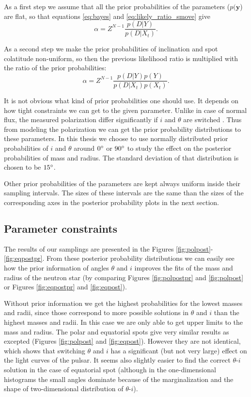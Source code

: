 \documentclass{wihuri}
\def\be{\begin{equation}}
\def\ee{\end{equation}}
\begin{document}
As a first step we assume that all the prior probabilities of the parameters ($p(\textbf{y}$) are flat, so that equations \ref{eq:bayes} and \ref{eq:likely_ratio_smove} give 
\be \label{eq:alpha1}
\alpha = Z^{N-1}\frac{p(D|Y)}{p(D|X_{t})}.
\ee

As a second step we make the prior probabilities of inclination and spot colatitude non-uniform, so then the previous likelihood ratio is multiplied with the ratio of the prior probabilities:
\be \label{eq:alpha2}
\alpha = Z^{N-1}\frac{p(D|Y)p(Y)}{p(D|X_{t})p(X_{t})}.
\ee

It is not obvious what kind of prior probabilities one should use. It depends on how tight constraints we can get to the given parameter. Unlike in case of normal flux, the measured polarization differ significantly if $i$ and $\theta$ are switched \cite{poutaviironen}. Thus from modeling the polarization we can get the prior probability distributions to these parameters. In this thesis we choose to use normally distributed prior probabilities of $i$ and $\theta$ around $0 \degree$ or $90 \degree$ to study the effect on the posterior probabilities of mass and radius. The standard deviation of that distribution is chosen to be $15 \degree$. 

Other prior probabilities of the parameters are kept always uniform inside their sampling intervals. The sizes of these intervals are the same than the sizes of the corresponding axes in the posterior probability plots in the next section. 



\subsection{Parameter constraints}

The results of our samplings are presented in the Figures \ref{fig:polpost}-\ref{fig:eqpostpr}. From these posterior probability distributions we can easily see how the prior information of angles $\theta$ and $i$ improves the fits of the mass and radius of the neutron star (by comparing Figures \ref{fig:polpostpr} and \ref{fig:polpost} or Figures \ref{fig:eqpostpr} and \ref{fig:eqpost}). 

Without prior information we get the highest probabilities for the lowest masses and radii, since those correspond to more possible solutions in  $\theta$ and $i$ than the highest masses and radii. In this case we are only able to get upper limits to the mass and radius. The polar and equatorial spots give very similar results as excepted (Figures \ref{fig:polpost} and \ref{fig:eqpost}). However they are not identical, which shows that switching $\theta$ and $i$ has a significant (but not very large) effect on the light curves of the pulsar. It seems also slightly easier to find the correct $\theta$-$i$ solution  in the case of equatorial spot (although in the one-dimensional histograms the small angles dominate because of the marginalization and the shape of two-dimensional distribution of $\theta$-$i$). 
\end{document}
